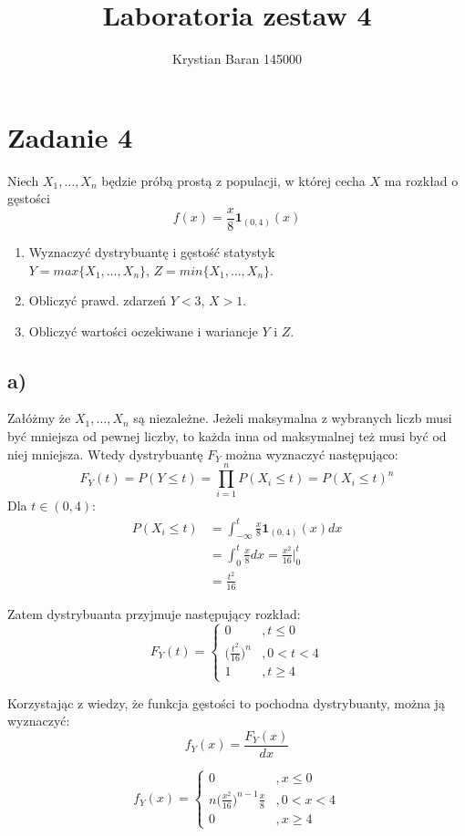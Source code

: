 \documentclass{article}
\author{Krystian Baran 145000}
\title{Laboratoria zestaw 4}
\begin{document}
\maketitle
\newpage

\section*{Zadanie 4}
Niech $X_1, \dots , X_n$ będzie próbą prostą z populacji, w której
cecha $X$ ma rozkład o gęstości
\[
f(x) = \frac{x}{8} \textbf{1}_{(0,4)}(x)
\]
\begin{enumerate}[label = \alph*)]
\item Wyznaczyć dystrybuantę i gęstość statystyk\\ $Y = max\{X_1,\dots, X_n\}$, $Z = min\{ X_1,\dots ,X_n \}$.
\item Obliczyć prawd. zdarzeń $Y<3$, $X>1$.
\item Obliczyć wartości oczekiwane i wariancje $Y$ i $Z$.
\end{enumerate}

\subsection*{a)}
Załóżmy że $X_1,\dots,X_n$ są niezależne. Jeżeli maksymalna z wybranych liczb musi być mniejsza od pewnej liczby, to każda inna od maksymalnej też musi być od niej mniejsza. Wtedy dystrybuantę $F_Y$ można wyznaczyć następująco:
\[
F_Y(t) = P(Y\leq t) = \prod_{i=1}^{n} P(X_i \leq t) = P(X_i \leq t)^n
\]
Dla $t \in (0,4)$:
\begin{align*}
P(X_i \leq t) & = \int_{-\infty}^{t} \frac{x}{8} \textbf{1}_{(0,4)}(x) dx \\
& = \int_{0}^{t} \frac{x}{8} dx = \frac{x^2}{16} \Big\vert_{0}^{t} \\
& = \frac{t^2}{16}
\end{align*}

Zatem dystrybuanta przyjmuje następujący rozkład:
\[
F_Y(t) = \left\{
\begin{array}{ll}
0 &, t \leq 0 \\
\Big( \frac{t^2}{16} \Big)^n &, 0<t<4 \\
1 &, t \geq 4
\end{array}
\right.
\]

Korzystając z wiedzy, że funkcja gęstości to pochodna dystrybuanty, można ją wyznaczyć:
\[
f_Y(x) = \frac{F_Y(x)}{dx}
\]

\[
f_Y(x) = \left\{
\begin{array}{ll}
0 &, x \leq 0 \\
n \Big( \frac{x^2}{16} \Big)^{n-1} \frac{x}{8} &, 0<x<4 \\
0 &, x \geq 4
\end{array}
\right.
\]
\end{document}
